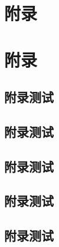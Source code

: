 




\begin{Appendix}


\chapter{附录}


\lipsum

\begin{Example}
	
\end{Example}

\chapter{附录}


\section{附录测试}

\end{Appendix}




\begin{Appendix}
	
\section{附录测试}



\begin{Topic}
\section{附录测试}
\end{Topic}

\section{附录测试}
	
\end{Appendix}




\begin{Appendix}
	
\section{附录测试}
	
\end{Appendix}



